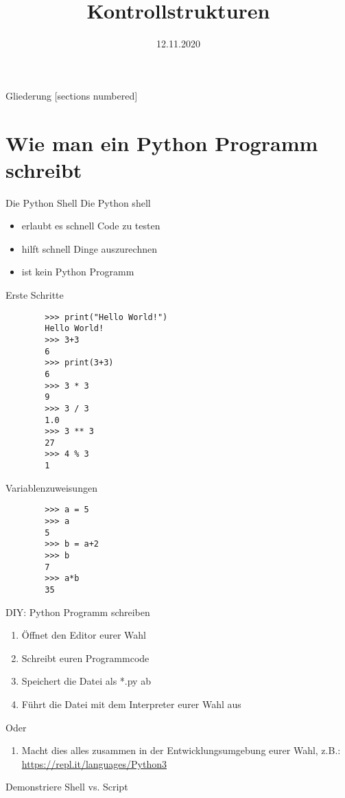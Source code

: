 



\title{Kontrollstrukturen}
\date{12.11.2020}




\maketitle

\begin{frame}{Gliederung}
    [sections numbered]
    \tableofcontents
\end{frame}

\section{Wie man ein Python Programm schreibt}
\begin{frame}{Die Python Shell}
	Die Python shell
	\begin{itemize}
		\item erlaubt es schnell Code zu testen
		\item hilft schnell Dinge auszurechnen
		\item ist kein Python Programm
	\end{itemize}
\end{frame}

\begin{frame}[fragile]{Erste Schritte}
	\begin{lstlisting}
		>>> print("Hello World!")
		Hello World!
		>>> 3+3
		6
		>>> print(3+3)
		6
		>>> 3 * 3
		9
		>>> 3 / 3 
		1.0
		>>> 3 ** 3
		27
		>>> 4 % 3
		1
	\end{lstlisting}
\end{frame}

\begin{frame}[fragile]{Variablenzuweisungen}
	\begin{lstlisting}
		>>> a = 5
		>>> a
		5
		>>> b = a+2
		>>> b
		7
		>>> a*b
		35	
	\end{lstlisting}
\end{frame}

\begin{frame}{DIY: Python Programm schreiben}
	\begin{enumerate}
		\item Öffnet den Editor eurer Wahl
		\item Schreibt euren Programmcode
		\item Speichert die Datei als *.py ab
		\item Führt die Datei mit dem Interpreter eurer Wahl aus
	\end{enumerate}
	Oder
	\begin{enumerate}
		\item Macht dies alles zusammen in der Entwicklungsumgebung eurer Wahl, z.B.: \url{https://repl.it/languages/Python3}
	\end{enumerate}
	\pause Demonstriere Shell vs. Script
\end{frame}

